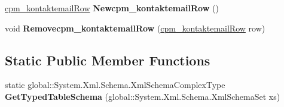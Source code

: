 \begin{DoxyCompactItemize}
\item 
\hyperlink{class_products_1_1_data_1_1ds_sage_1_1cpm__kontaktemail_row}{cpm\+\_\+kontaktemail\+Row} {\bfseries Newcpm\+\_\+kontaktemail\+Row} ()\hypertarget{class_products_1_1_data_1_1ds_sage_1_1cpm__kontaktemail_data_table_a383c99a1b2fdabd772d7a85a45ccdbcb}{}\label{class_products_1_1_data_1_1ds_sage_1_1cpm__kontaktemail_data_table_a383c99a1b2fdabd772d7a85a45ccdbcb}

\item 
void {\bfseries Removecpm\+\_\+kontaktemail\+Row} (\hyperlink{class_products_1_1_data_1_1ds_sage_1_1cpm__kontaktemail_row}{cpm\+\_\+kontaktemail\+Row} row)\hypertarget{class_products_1_1_data_1_1ds_sage_1_1cpm__kontaktemail_data_table_affa896cb79c0f0d13008b3ed4dd2ff20}{}\label{class_products_1_1_data_1_1ds_sage_1_1cpm__kontaktemail_data_table_affa896cb79c0f0d13008b3ed4dd2ff20}

\end{DoxyCompactItemize}
\subsection*{Static Public Member Functions}
\begin{DoxyCompactItemize}
\item 
static global\+::\+System.\+Xml.\+Schema.\+Xml\+Schema\+Complex\+Type {\bfseries Get\+Typed\+Table\+Schema} (global\+::\+System.\+Xml.\+Schema.\+Xml\+Schema\+Set xs)\hypertarget{class_products_1_1_data_1_1ds_sage_1_1cpm__kontaktemail_data_table_a387cd3be12c9585e7db59d157840fe1d}{}\label{class_products_1_1_data_1_1ds_sage_1_1cpm__kontaktemail_data_table_a387cd3be12c9585e7db59d157840fe1d}

\end{DoxyCompactItemize}
